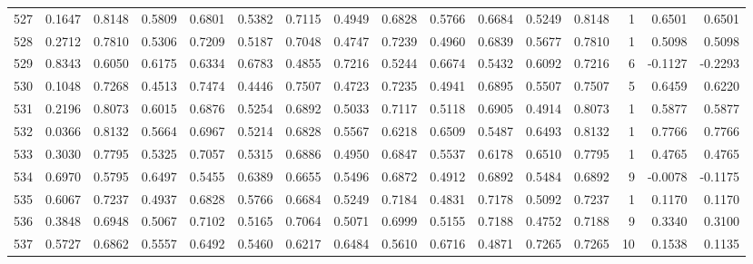\begin{tabular}{lrrrrrrrrrrrrrrr}
527 &      0.1647 &  0.8148 &  0.5809 &  0.6801 &  0.5382 &  0.7115 &  0.4949 &  0.6828 &  0.5766 &  0.6684 &   0.5249 &     0.8148 &      1 &                    0.6501 &                     0.6501 \\
528 &      0.2712 &  0.7810 &  0.5306 &  0.7209 &  0.5187 &  0.7048 &  0.4747 &  0.7239 &  0.4960 &  0.6839 &   0.5677 &     0.7810 &      1 &                    0.5098 &                     0.5098 \\
529 &      0.8343 &  0.6050 &  0.6175 &  0.6334 &  0.6783 &  0.4855 &  0.7216 &  0.5244 &  0.6674 &  0.5432 &   0.6092 &     0.7216 &      6 &                   -0.1127 &                    -0.2293 \\
530 &      0.1048 &  0.7268 &  0.4513 &  0.7474 &  0.4446 &  0.7507 &  0.4723 &  0.7235 &  0.4941 &  0.6895 &   0.5507 &     0.7507 &      5 &                    0.6459 &                     0.6220 \\
531 &      0.2196 &  0.8073 &  0.6015 &  0.6876 &  0.5254 &  0.6892 &  0.5033 &  0.7117 &  0.5118 &  0.6905 &   0.4914 &     0.8073 &      1 &                    0.5877 &                     0.5877 \\
532 &      0.0366 &  0.8132 &  0.5664 &  0.6967 &  0.5214 &  0.6828 &  0.5567 &  0.6218 &  0.6509 &  0.5487 &   0.6493 &     0.8132 &      1 &                    0.7766 &                     0.7766 \\
533 &      0.3030 &  0.7795 &  0.5325 &  0.7057 &  0.5315 &  0.6886 &  0.4950 &  0.6847 &  0.5537 &  0.6178 &   0.6510 &     0.7795 &      1 &                    0.4765 &                     0.4765 \\
534 &      0.6970 &  0.5795 &  0.6497 &  0.5455 &  0.6389 &  0.6655 &  0.5496 &  0.6872 &  0.4912 &  0.6892 &   0.5484 &     0.6892 &      9 &                   -0.0078 &                    -0.1175 \\
535 &      0.6067 &  0.7237 &  0.4937 &  0.6828 &  0.5766 &  0.6684 &  0.5249 &  0.7184 &  0.4831 &  0.7178 &   0.5092 &     0.7237 &      1 &                    0.1170 &                     0.1170 \\
536 &      0.3848 &  0.6948 &  0.5067 &  0.7102 &  0.5165 &  0.7064 &  0.5071 &  0.6999 &  0.5155 &  0.7188 &   0.4752 &     0.7188 &      9 &                    0.3340 &                     0.3100 \\
537 &      0.5727 &  0.6862 &  0.5557 &  0.6492 &  0.5460 &  0.6217 &  0.6484 &  0.5610 &  0.6716 &  0.4871 &   0.7265 &     0.7265 &     10 &                    0.1538 &                     0.1135 \\

\end{tabular}
